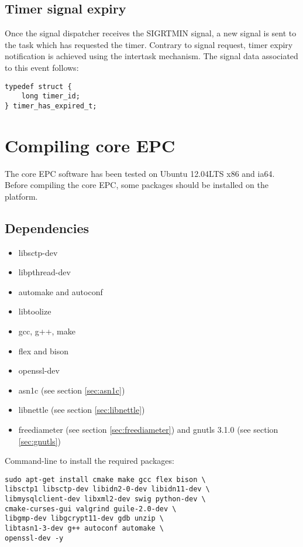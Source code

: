 \documentclass[a4paper,oneside]{report}
\begin{document}
\section{Timer signal expiry}

Once the signal dispatcher receives the SIGRTMIN signal, a new signal is sent
to the task which has requested the timer. Contrary to signal request, timer
expiry notification is achieved using the intertask mechanism.
The signal data associated to this event follows:
\begin{lstlisting}
typedef struct {
    long timer_id;
} timer_has_expired_t;
\end{lstlisting}

\chapter*{Compiling core EPC} 

The core EPC software has been tested on Ubuntu 12.04LTS x86 and ia64.
Before compiling the core EPC, some packages should be installed on the platform.

\section{Dependencies}

\begin{itemize}
 \item libsctp-dev
 \item libpthread-dev
 \item automake and autoconf
 \item libtoolize
 \item gcc, g++, make
 \item flex and bison
 \item openssl-dev
 \item asn1c (see section \ref{sec:asn1c})
 \item libnettle (see section \ref{sec:libnettle})
 \item freediameter (see section \ref{sec:freediameter}) and gnutls 3.1.0
 (see section \ref{sec:gnutls})
\end{itemize}
Command-line to install the required packages:
\begin{lstlisting}
sudo apt-get install cmake make gcc flex bison \
libsctp1 libsctp-dev libidn2-0-dev libidn11-dev \
libmysqlclient-dev libxml2-dev swig python-dev \
cmake-curses-gui valgrind guile-2.0-dev \
libgmp-dev libgcrypt11-dev gdb unzip \
libtasn1-3-dev g++ autoconf automake \
openssl-dev -y
\end{lstlisting}
\end{document}
